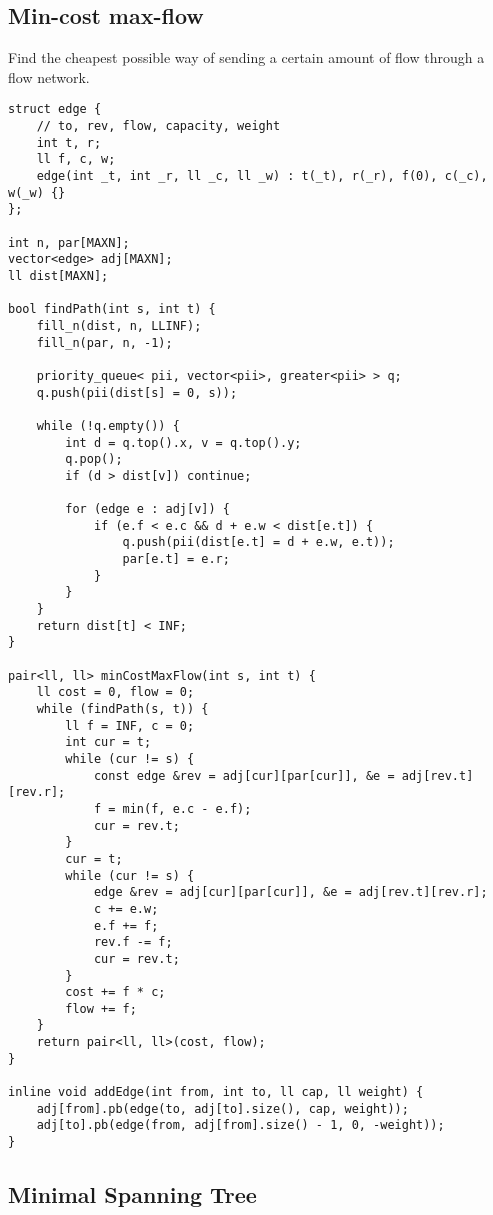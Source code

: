 \documentclass{article}
\begin{document}
\subsection{Min-cost max-flow}

Find the cheapest possible way of sending a certain amount of flow through a flow network.

\begin{lstlisting}
struct edge {
	// to, rev, flow, capacity, weight
	int t, r;
	ll f, c, w;
	edge(int _t, int _r, ll _c, ll _w) : t(_t), r(_r), f(0), c(_c), w(_w) {}
};

int n, par[MAXN];
vector<edge> adj[MAXN];
ll dist[MAXN];

bool findPath(int s, int t) {
	fill_n(dist, n, LLINF);
	fill_n(par, n, -1);

	priority_queue< pii, vector<pii>, greater<pii> > q;
	q.push(pii(dist[s] = 0, s));

	while (!q.empty()) {
		int d = q.top().x, v = q.top().y;
		q.pop();
		if (d > dist[v]) continue;

		for (edge e : adj[v]) {
			if (e.f < e.c && d + e.w < dist[e.t]) {
				q.push(pii(dist[e.t] = d + e.w, e.t));
				par[e.t] = e.r;
			}
		}
	}
	return dist[t] < INF;
}

pair<ll, ll> minCostMaxFlow(int s, int t) {
	ll cost = 0, flow = 0;
	while (findPath(s, t)) {
		ll f = INF, c = 0;
		int cur = t;
		while (cur != s) {
			const edge &rev = adj[cur][par[cur]], &e = adj[rev.t][rev.r];
			f = min(f, e.c - e.f);
			cur = rev.t;
		}
		cur = t;
		while (cur != s) {
			edge &rev = adj[cur][par[cur]], &e = adj[rev.t][rev.r];
			c += e.w;
			e.f += f;
			rev.f -= f;
			cur = rev.t;
		}
		cost += f * c;
		flow += f;
	}
	return pair<ll, ll>(cost, flow);
}

inline void addEdge(int from, int to, ll cap, ll weight) {
	adj[from].pb(edge(to, adj[to].size(), cap, weight));
	adj[to].pb(edge(from, adj[from].size() - 1, 0, -weight));
}
\end{lstlisting}

\subsection{Minimal Spanning Tree}
\end{document}
